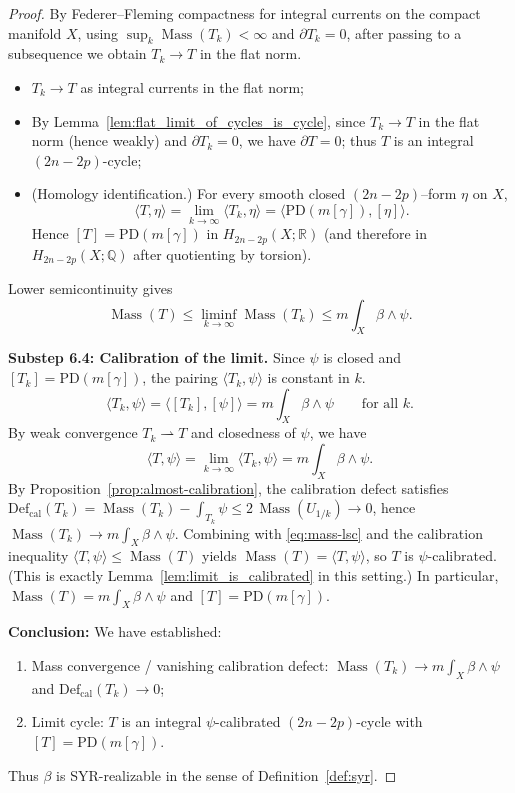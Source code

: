 \documentclass[11pt]{article}
\newcommand{\REVMZ}[1]{\textcolor{teal}{#1}}  %
\numberwithin{equation}{section}  %
\theoremstyle{plain}
\theoremstyle{definition}
\theoremstyle{remark}
\newcommand{\R}{\mathbb{R}}
\newcommand{\Q}{\mathbb{Q}}
\DeclareMathOperator{\Mass}{Mass}
\newcommand{\Def}{\mathrm{Def}}
\begin{document}
\begin{proof}
By Federer--Fleming compactness \REVMZ{\cite{FF60,Fed69}} for integral currents on the compact manifold $X$, using $\sup_k\Mass(T_k)<\infty$ and $\partial T_k=0$, after passing to a subsequence we obtain $T_k\to T$ in the flat norm. \begin{itemize}
\item $T_k\to T$ as integral currents in the flat norm;
\item By Lemma~\ref{lem:flat_limit_of_cycles_is_cycle}, since $T_k\to T$ in the flat norm (hence weakly) and $\partial T_k=0$, we have $\partial T=0$; thus $T$ is an integral $(2n-2p)$-cycle;
\item (Homology identification.) For every smooth closed $(2n-2p)$--form $\eta$ on $X$,
\[
\langle T,\eta\rangle=\lim_{k\to\infty}\langle T_k,\eta\rangle
=\bigl\langle \mathrm{PD}(m[\gamma]),[\eta]\bigr\rangle.
\]
Hence $[T]=\mathrm{PD}(m[\gamma])$ in $H_{2n-2p}(X;\R)$ (and therefore in $H_{2n-2p}(X;\Q)$ after quotienting by torsion).
\end{itemize}
Lower semicontinuity gives
\begin{equation}\label{eq:mass-lsc}
\Mass(T)\le\liminf_{k\to\infty}\Mass(T_k)\le m\int_X\beta\wedge\psi.
\end{equation}

\medskip\noindent
\textbf{Substep 6.4: Calibration of the limit.}
Since $\psi$ is closed and $[T_k]=\mathrm{PD}(m[\gamma])$, the pairing $\langle T_k,\psi\rangle$ is constant in $k$.
\[
\langle T_k,\psi\rangle=\langle[T_k],[\psi]\rangle=m\int_X\beta\wedge\psi\qquad\text{for all }k.
\]
By weak convergence $T_k\rightharpoonup T$ and closedness of $\psi$, we have
\[
\langle T,\psi\rangle=\lim_{k\to\infty}\langle T_k,\psi\rangle=m\int_X\beta\wedge\psi.
\]
By Proposition~\ref{prop:almost-calibration}, the calibration defect satisfies $\Def_{\mathrm{cal}}(T_k)=\Mass(T_k)-\int_{T_k}\psi\le 2\,\Mass(U_{1/k})\to 0$, hence $\Mass(T_k)\to m\int_X\beta\wedge\psi$.
Combining with \eqref{eq:mass-lsc} and the calibration inequality $\langle T,\psi\rangle\le \Mass(T)$ yields $\Mass(T)=\langle T,\psi\rangle$, so $T$ is $\psi$-calibrated. (This is exactly Lemma~\ref{lem:limit_is_calibrated} in this setting.)
In particular, $\Mass(T)=m\int_X\beta\wedge\psi$ and $[T]=\mathrm{PD}(m[\gamma])$.

\textbf{Conclusion:} We have established:
\begin{enumerate}
\item Mass convergence / vanishing calibration defect:
$\Mass(T_k)\to m\int_X\beta\wedge\psi$ and $\Def_{\mathrm{cal}}(T_k)\to 0$;
\item Limit cycle: $T$ is an integral $\psi$-calibrated $(2n-2p)$-cycle
with $[T]=\mathrm{PD}(m[\gamma])$.
\end{enumerate}
Thus $\beta$ is SYR-realizable in the sense of Definition~\ref{def:syr}.
\end{proof}
\end{document}
